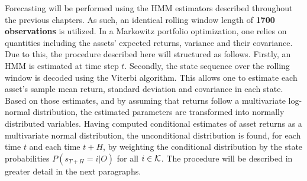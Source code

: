 Forecasting will be performed using the HMM estimators described throughout the previous chapters. As such, an identical rolling window length of \textbf{1700 observations} is utilized. In a Markowitz portfolio optimization, one relies on quantities including the assets' expected returns, variance and their covariance. Due to this, the procedure described here will structured as follows. Firstly, an HMM is estimated at time step $t$. Secondly, the state sequence over the rolling window is decoded using the Viterbi algorithm. This allows one to estimate each asset's sample mean return, standard deviation and covariance in each state. Based on those estimates, and by assuming that returns follow a multivariate log-normal distribution, the estimated parameters are transformed into normally distributed variables. Having computed conditional estimates of asset returns as a multivariate normal distribution, the unconditional distribution is found, for each time $t$ and each time $t+H$, by weighting the conditional distribution by the state probabilities $P(s_{T+H}=i | O)$ for all $i\in\operatorname{\mathcal{K}}$. The procedure will be described in greater detail in the next paragraphs.

